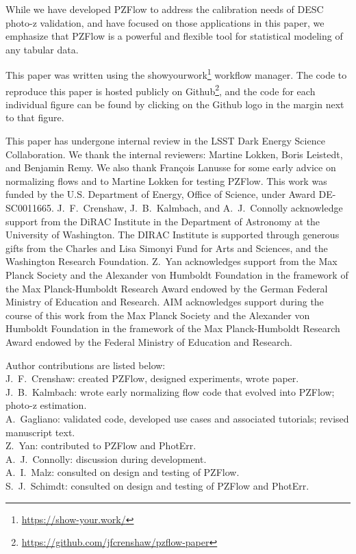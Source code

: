 \documentclass[twocolumn,twocolappendix]{aastex631}
\begin{document}
While we have developed PZFlow to address the calibration needs of DESC photo-z validation, and have focused on those applications in this paper, we emphasize that PZFlow is a powerful and flexible tool for statistical modeling of any tabular data.

This paper was written using the showyourwork\footnote{\url{https://show-your.work/}} workflow manager.
The code to reproduce this paper is hosted publicly on Github\footnote{\url{https://github.com/jfcrenshaw/pzflow-paper}}, and the code for each individual figure can be found by clicking on the Github logo in the margin next to that figure.

\begin{acknowledgements}
    This paper has undergone internal review in the LSST Dark Energy Science Collaboration.
    We thank the internal reviewers: Martine Lokken, Boris Leistedt, and Benjamin Remy.
    We also thank François Lanusse for some early advice on normalizing flows and to Martine Lokken for testing PZFlow.
    This work was funded by the U.S. Department of Energy, Office of Science, under Award DE-SC0011665.
    J.~F.~Crenshaw, J.~B.~Kalmbach, and A.~J.~Connolly acknowledge support from the DiRAC Institute in the Department of Astronomy at the University of Washington.
    The DIRAC Institute is supported through generous gifts from the Charles and Lisa Simonyi Fund for Arts and Sciences, and the Washington Research Foundation.
    Z.~Yan acknowledges support from the Max Planck Society and the Alexander von Humboldt Foundation in the framework of the Max Planck-Humboldt Research Award endowed by the German Federal Ministry of Education and Research.
    AIM acknowledges support during the course of this work from the Max Planck Society and the Alexander von Humboldt Foundation in the framework of the Max Planck-Humboldt Research Award endowed by the Federal Ministry of Education and Research.

    Author contributions are listed below: \\
    J.~F.~Crenshaw: created PZFlow, designed experiments, wrote paper. \\
    J.~B.~Kalmbach: wrote early normalizing flow code that evolved into PZFlow; photo-z estimation. \\
    A.~Gagliano: validated code, developed use cases and associated tutorials; revised manuscript text. \\
    Z.~Yan: contributed to PZFlow and PhotErr. \\
    A.~J.~Connolly: discussion during development. \\
    A.~I.~Malz: consulted on design and testing of PZFlow. \\
    S.~J.~Schimdt: consulted on design and testing of PZFlow and PhotErr. \\
\end{acknowledgements}
\end{document}
